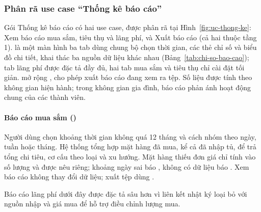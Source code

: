 \subsubsection{Phân rã use case “Thống kê báo cáo”}\label{sssec:pr-thong-ke}

Gói Thống kê báo cáo có hai use case, được phân rã tại Hình~\ref{fig:uc-thong-ke}:  Xem báo cáo mua sắm, tiêu thụ và lãng phí, và  Xuất báo cáo (cả hai thuộc tầng 1).  là một màn hình ba tab dùng chung bộ chọn thời gian, các thẻ chỉ số và biểu đồ chi tiết, khai thác ba nguồn dữ liệu khác nhau (Bảng~\ref{tab:chi-so-bao-cao}); tab lãng phí được đặc tả đầy đủ, hai tab mua sắm và tiêu thụ chỉ cài đặt tối giản.  mở rộng , cho phép xuất báo cáo đang xem ra tệp. Số liệu được tính theo không gian hiện hành; trong không gian gia đình, báo cáo phản ánh hoạt động chung của các thành viên.



\paragraph*{Báo cáo mua sắm ()}
Người dùng chọn khoảng thời gian không quá 12 tháng và cách nhóm theo ngày, tuần hoặc tháng. Hệ thống tổng hợp mặt hàng đã mua, kể cả đã nhập tủ, để trả tổng chi tiêu, cơ cấu theo loại và xu hướng. Mặt hàng thiếu đơn giá chỉ tính vào số lượng và được nêu riêng; khoảng ngày sai báo , không có dữ liệu báo . Xem báo cáo không thay đổi dữ liệu; xuất tệp dùng .


Báo cáo lãng phí dưới đây được đặc tả sâu hơn vì liên kết nhật ký loại bỏ với nguồn nhập và giá mua để hỗ trợ điều chỉnh lượng mua.

